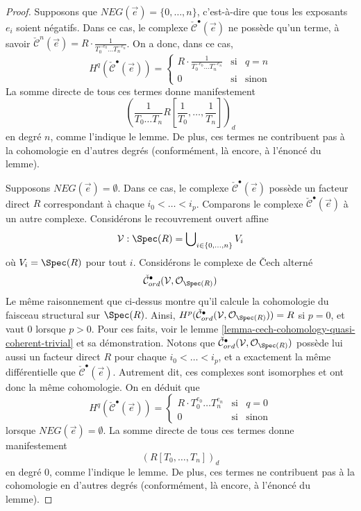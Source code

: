 \begin{proof}
\medskip\noindent
Supposons que $NEG(\vec{e}) = \{0, \ldots, n\}$, c'est-à-dire que tous les
exposants $e_i$ soient négatifs.
Dans ce cas, le complexe $\check{\mathcal{C}}^\bullet(\vec{e})$ ne
possède qu'un terme, à savoir $\check{\mathcal{C}}^n(\vec{e}) =
R \cdot \frac{1}{T_0^{-e_0} \ldots T_n^{-e_n}}$. On a donc, dans ce
cas,
$$
H^q(\check{\mathcal{C}}^\bullet(\vec{e})) =
\left\{
\begin{matrix}
R \cdot \frac{1}{T_0^{-e_0} \ldots T_n^{-e_n}} & \text{si} & q = n \\
0 & \text{si} & \text{sinon}
\end{matrix}
\right.
$$
La somme directe de tous ces termes donne manifestement
$$
\left(\frac{1}{T_0 \ldots T_n} R[\frac{1}{T_0}, \ldots, \frac{1}{T_n}]\right)_d
$$
en degré $n$, comme l'indique le lemme. De plus, ces termes ne contribuent
pas à la cohomologie en d'autres degrés (conformément, là encore, à l'énoncé du
lemme).

\medskip\noindent
Supposons $NEG(\vec{e}) = \emptyset$. Dans ce cas, le complexe
$\check{\mathcal{C}}^\bullet(\vec{e})$ possède un facteur direct $R$ correspondant
à chaque $i_0 < \ldots < i_p$.
Comparons le complexe $\check{\mathcal{C}}^\bullet(\vec{e})$
à un autre complexe. Considérons le recouvrement ouvert affine
$$
\mathcal{V} : \Spec(R) = \bigcup\nolimits_{i \in \{0, \ldots, n\}} V_i
$$
où $V_i = \Spec(R)$ pour tout $i$. Considérons le complexe de
{\v C}ech alterné
$$
\check{\mathcal{C}}_{ord}^\bullet(\mathcal{V}, \mathcal{O}_{\Spec(R)})
$$
Le même raisonnement que ci-dessus montre qu'il calcule la cohomologie du
faisceau structural sur $\Spec(R)$. Ainsi,
$H^p(
\check{\mathcal{C}}_{ord}^\bullet(\mathcal{V}, \mathcal{O}_{\Spec(R)})
) = R$ si $p = 0$, et vaut $0$ lorsque $p > 0$.
Pour ces faits, voir le
lemme \ref{lemma-cech-cohomology-quasi-coherent-trivial} et sa
démonstration. Notons que
$\check{\mathcal{C}}_{ord}^\bullet(\mathcal{V}, \mathcal{O}_{\Spec(R)})$
possède lui aussi un facteur direct $R$ pour chaque $i_0 < \ldots < i_p$, et a exactement la même
différentielle que $\check{\mathcal{C}}^\bullet(\vec{e})$. Autrement dit, ces
complexes sont isomorphes et ont donc la même cohomologie. On
en déduit que
$$
H^q(\check{\mathcal{C}}^\bullet(\vec{e})) =
\left\{
\begin{matrix}
R \cdot T_0^{e_0} \ldots T_n^{e_n} & \text{si} & q = 0 \\
0 & \text{si} & \text{sinon}
\end{matrix}
\right.
$$
lorsque $NEG(\vec{e}) = \emptyset$.
La somme directe de tous ces termes donne manifestement
$$
(R[T_0, \ldots, T_n])_d
$$
en degré $0$, comme l'indique le lemme. De plus, ces termes ne contribuent
pas à la cohomologie en d'autres degrés (conformément, là encore, à l'énoncé du
lemme).


\end{proof}
